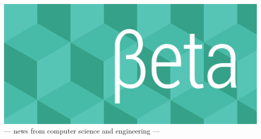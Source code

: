 \documentclass[twoside]{article}
\date{16 March 2015}
\begin{document}
\thispagestyle{empty}
\begingroup%
\vspace*{-3.5cm}\centering\hspace*{-2.8cm}%
\includegraphics[trim=0mm 20mm 0mm 0mm, clip, width=22cm]{../../style/beta-logo.pdf}%
\vspace{1em}
{\sffamily\fontsize{32pt}{32pt}\selectfont --- news from computer science and engineering ---}
\endgroup\vfill
\end{document}
